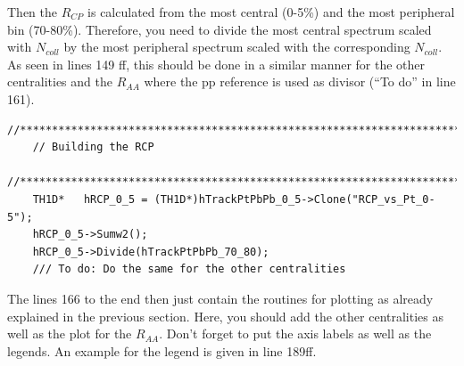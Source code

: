 \documentclass{article}
\begin{document}
Then the $R_{CP}$ is calculated from the most central (0-5\%) and the most 
peripheral bin (70-80\%). Therefore, you need to divide the most central 
spectrum scaled with $N_{coll}$ by the most peripheral spectrum scaled with the
corresponding $N_{coll}$. As seen in lines 149 ff, this should be done in a 
similar manner for the other centralities and the $R_{AA}$ where the pp 
reference is used as divisor (``To do'' in line 161).

\begin{lstlisting}[firstnumber=149]
	//*********************************************************************************
	// Building the RCP
	//*********************************************************************************
	TH1D*	hRCP_0_5 = (TH1D*)hTrackPtPbPb_0_5->Clone("RCP_vs_Pt_0-5");
	hRCP_0_5->Sumw2();
	hRCP_0_5->Divide(hTrackPtPbPb_70_80);
	/// To do: Do the same for the other centralities 
\end{lstlisting}

The lines 166 to the end then just contain the routines for plotting as 
already explained in the previous section. Here, you should add the other 
centralities as well as the plot for the $R_{AA}$. Don't forget to put the 
axis labels as well as the legends. An example for the legend is given in 
line 189ff.
\end{document}
